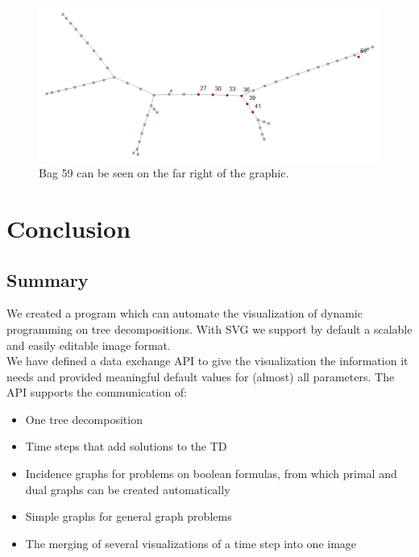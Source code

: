 \documentclass[a4paper, 12pt, bibliography=totoc]{scrartcl}
\begin{document}
\begin{figure}
	\centering
	\includegraphics[width=0.9\linewidth,height=0.9\textheight,keepaspectratio]{images/stars100var100.png}
	\caption{Bag 59 can be seen on the far right of the graphic.}
	\label{fig:bag59td}
\end{figure}
\newpage
\section{Conclusion}\label{sec:conclusion}
\subsection{Summary}
We created a program which can automate the visualization of dynamic programming on tree decompositions.
With SVG we support by default a scalable and easily editable image format.\\

We have defined a data exchange API to give the visualization the information it needs and provided meaningful default values for (almost) all parameters. The API supports the communication of:
\begin{itemize}
	\item One tree decomposition
	\item Time steps that add solutions to the TD
	\item Incidence graphs for problems on boolean formulas, from which primal and dual graphs can be created automatically
	\item Simple graphs for general graph problems
	\item The merging of several visualizations of a time step into one image
\end{itemize}
\end{document}
